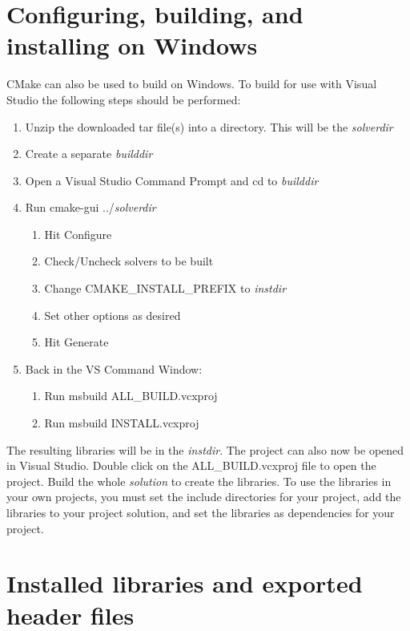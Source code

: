\section{Configuring, building, and installing  on Windows}\label{s:cmake_windows}
CMake can also be used to build {\sundials} on Windows. To build {\sundials} for
use with Visual Studio the following steps should be performed:
\begin{enumerate}
\item Unzip the downloaded tar file(s) into a directory. This will be the {\em solverdir}
\item Create a separate {\em builddir}
\item Open a Visual Studio Command Prompt and cd to {\em builddir}
\item Run cmake-gui ../{\em solverdir}
\begin{enumerate}
\item Hit Configure
\item Check/Uncheck solvers to be built
\item Change CMAKE\_INSTALL\_PREFIX to {\em instdir}
\item Set other options as desired
\item Hit Generate
\end{enumerate}
\item Back in the VS Command Window:
\begin{enumerate}
\item Run msbuild ALL\_BUILD.vcxproj
\item Run msbuild INSTALL.vcxproj
\end{enumerate}
\end{enumerate}

\noindent The resulting libraries will be in the {\em instdir}.
\noindent The {\sundials} project can also now be opened in Visual Studio.
Double click on the ALL\_BUILD.vcxproj file to open the project.
Build the whole {\em solution} to create the {\sundials} libraries.
To use the {\sundials} libraries in your own projects, you must
set the include directories for your project,
add the {\sundials} libraries to your project solution,
and set the {\sundials} libraries as dependencies for your project.

\section{Installed libraries and exported header files}

